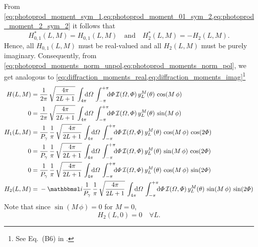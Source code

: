 From
\cref{eq:photoprod_moment_sym_1,eq:photoprod_moment_01_sym_2,eq:photoprod_moment_2_sym_2}
it follows that
\begin{equation}
  \label{eq:photoprodP_moments_real_imag}
  H_{0, 1}^*(L, M) = H_{0, 1}(L, M)
  \quad\text{and}\quad
  H_2^*(L, M) = -H_2(L, M).
\end{equation}
Hence, all $H_{0, 1}(L, M)$ must be real-valued and all $H_2(L, M)$
must be purely imaginary.  Consequently, from
\cref{eq:photoprod_moments_norm_unpol,eq:photoprod_moments_norm_pol},
we get analogous to
\cref{eq:diffraction_moments_real,eq:diffraction_moments_imag}\footnote{See
Eq.~(B6) in .}
\begin{align}
  \label{eq:photoprod_moment_0_real}
  H(L, M)
  ={}& \frac{1}{2 \pi}\, \sqrt{\frac{4 \pi}{2 L + 1}}\, \int_{4 \pi}\!\!\! \dif{\Omega}\, \int_{-\pi}^{+\pi}\!\!\! \dif{\Phi}\,
  \mathcal{I}(\Omega, \Phi)\, y_L^M(\theta)\, \cos(M\, \phi)
  \\
  \label{eq:photoprod_moment_0_imag}
  0
  ={}& \frac{1}{2 \pi}\, \sqrt{\frac{4 \pi}{2 L + 1}}\, \int_{4 \pi}\!\!\! \dif{\Omega}\, \int_{-\pi}^{+\pi}\!\!\! \dif{\Phi}\,
  \mathcal{I}(\Omega, \Phi)\, y_L^M(\theta)\, \sin(M\, \phi)
  \\
  \label{eq:photoprod_moment_1_real}
  H_1(L, M)
  ={}& \frac{1}{P_\gamma}\, \frac{1}{\pi}\, \sqrt{\frac{4 \pi}{2 L + 1}}\, \int_{4 \pi}\!\!\! \dif{\Omega}\, \int_{-\pi}^{+\pi}\!\!\! \dif{\Phi}\,
  \mathcal{I}(\Omega, \Phi)\, y_L^M(\theta)\, \cos(M\, \phi)\, \cos(2 \Phi)
  \\
  \label{eq:photoprod_moment_1_imag}
  0
  ={}& \frac{1}{P_\gamma}\, \frac{1}{\pi}\, \sqrt{\frac{4 \pi}{2 L + 1}}\, \int_{4 \pi}\!\!\! \dif{\Omega}\, \int_{-\pi}^{+\pi}\!\!\! \dif{\Phi}\,
  \mathcal{I}(\Omega, \Phi)\, y_L^M(\theta)\, \sin(M\, \phi)\, \cos(2 \Phi)
  \\
  \label{eq:photoprod_moment_2_real}
  0
  ={}& \frac{1}{P_\gamma}\, \frac{1}{\pi}\, \sqrt{\frac{4 \pi}{2 L + 1}}\, \int_{4 \pi}\!\!\! \dif{\Omega}\, \int_{-\pi}^{+\pi}\!\!\! \dif{\Phi}\,
  \mathcal{I}(\Omega, \Phi)\, y_L^M(\theta)\, \cos(M\, \phi)\, \sin(2 \Phi)
  \\
  \label{eq:photoprod_moment_2_imag}
  H_2(L, M)
  ={}& -\imag \frac{1}{P_\gamma}\, \frac{1}{\pi}\, \sqrt{\frac{4 \pi}{2 L + 1}}\, \int_{4 \pi}\!\!\! \dif{\Omega}\, \int_{-\pi}^{+\pi}\!\!\! \dif{\Phi}\,
  \mathcal{I}(\Omega, \Phi)\, y_L^M(\theta)\, \sin(M\, \phi)\, \sin(2 \Phi)
\end{align}
Note that since $\sin(M\, \phi) = 0$ for $M = 0$,
\begin{equation}
  \label{eq:photoprod_moment_2_M0}
  H_2(L, 0) = 0
  \quad\forall L.
\end{equation}

